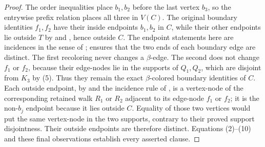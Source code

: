 \begin{proof}
The order inequalities place $b_1,b_2$ before the last vertex $b_3$,
so the entrywise prefix relation
 places all three in $V(C)$.  The
original boundary identities $f_1,f_2$ have their inside endpoints
$b_1,b_2$ in $C$, while their other endpoints lie outside $T$ by
 and , hence outside
$C$.  The endpoint statements here are incidences in the sense of
;  ensures that the two
ends of each boundary edge are distinct.  The first recoloring never
changes a $\beta$-edge.  The second does not change $f_1$ or $f_2$,
because their edge-nodes lie in the supports of $Q_1,Q_2$, which are
disjoint from $K_3$ by (5).  Thus they remain the exact
$\beta$-colored boundary identities of $C$.  Each outside endpoint, by
 and the incidence rule of
, is a vertex-node of the corresponding
retained walk $R_1$ or $R_2$ adjacent to its edge-node $f_1$ or $f_2$;
it is the non-$b_j$ endpoint because it lies outside $C$.  Equality of
those two vertices would
put the same vertex-node in the two supports, contrary to their proved
support disjointness.  Their outside endpoints are therefore distinct.
Equations (2)--(10) and these final observations establish every asserted
clause.
\end{proof}
